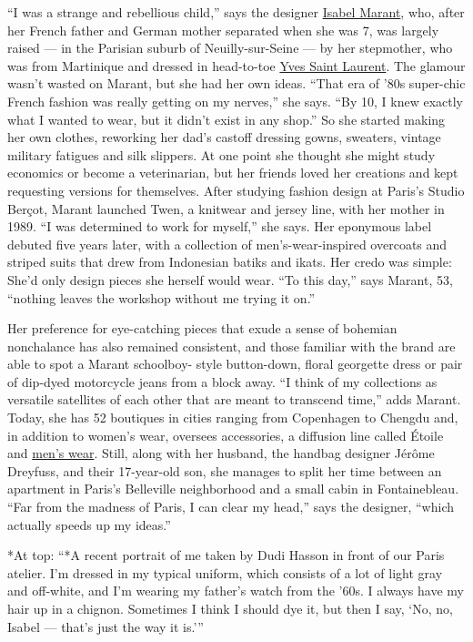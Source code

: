 ``I was a strange and rebellious child,'' says the designer
\href{https://www.nytimes.com/slideshow/2019/03/02/t-magazine/48-hours-with-isabel-marant-in-paris.html}{Isabel
Marant}, who, after her French father and German mother separated when
she was 7, was largely raised --- in the Parisian suburb of
Neuilly-sur-Seine --- by her stepmother, who was from Martinique and
dressed in head-to-toe
\href{https://www.nytimes.com/topic/person/yves-saint-laurent}{Yves
Saint Laurent}. The glamour wasn't wasted on Marant, but she had her own
ideas. ``That era of '80s super-chic French fashion was really getting
on my nerves,'' she says. ``By 10, I knew exactly what I wanted to wear,
but it didn't exist in any shop.'' So she started making her own
clothes, reworking her dad's castoff dressing gowns, sweaters, vintage
military fatigues and silk slippers. At one point she thought she might
study economics or become a veterinarian, but her friends loved her
creations and kept requesting versions for themselves. After studying
fashion design at Paris's Studio Berçot, Marant launched Twen, a
knitwear and jersey line, with her mother in 1989. ``I was determined to
work for myself,'' she says. Her eponymous label debuted five years
later, with a collection of men's-wear-inspired overcoats and striped
suits that drew from Indonesian batiks and ikats. Her credo was simple:
She'd only design pieces she herself would wear. ``To this day,'' says
Marant, 53, ``nothing leaves the workshop without me trying it on.''

Her preference for eye-catching pieces that exude a sense of bohemian
nonchalance has also remained consistent, and those familiar with the
brand are able to spot a Marant schoolboy- style button-down, floral
georgette dress or pair of dip-dyed motorcycle jeans from a block away.
``I think of my collections as versatile satellites of each other that
are meant to transcend time,'' adds Marant. Today, she has 52 boutiques
in cities ranging from Copenhagen to Chengdu and, in addition to women's
wear, oversees accessories, a diffusion line called Étoile and
\href{https://www.nytimes.com/2017/09/29/fashion/isabel-marant-menswear-paris-fashion-week.html}{men's
wear}. Still, along with her husband, the handbag designer Jérôme
Dreyfuss, and their 17-year-old son, she manages to split her time
between an apartment in Paris's Belleville neighborhood and a small
cabin in Fontainebleau. ``Far from the madness of Paris, I can clear my
head,'' says the designer, ``which actually speeds up my ideas.''

*At top: ``*A recent portrait of me taken by Dudi Hasson in front of our
Paris atelier. I'm dressed in my typical uniform, which consists of a
lot of light gray and off-white, and I'm wearing my father's watch from
the '60s. I always have my hair up in a chignon. Sometimes I think I
should dye it, but then I say, `No, no, Isabel --- that's just the way
it is.'''

